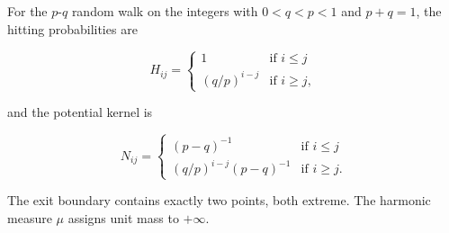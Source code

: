 For the $p$-$q$ random walk on the integers with $0 < q < p < 1$ and $p+q=1$, the hitting probabilities are

$$H_{ij} = \begin{cases} 1 & \text{if } i \leq j \\ (q/p)^{i-j} & \text{if } i \geq j, \end{cases}$$

and the potential kernel is

$$N_{ij} = \begin{cases} (p - q)^{-1} & \text{if } i \leq j \\ (q/p)^{i-j}(p-q)^{-1} & \text{if } i \geq j. \end{cases}$$

The exit boundary contains exactly two points, both extreme. The harmonic measure $\mu$ assigns unit mass to $+\infty$.
